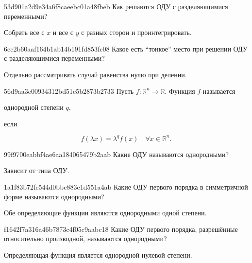 \begin{note}{53d901a2d9e34a6f8caeebc01a48fbeb}
    Как решаются ОДУ с разделяющимися переменными?

    \begin{cloze}{1}
        Собрать все с \({ x }\) и все с \({ y }\) с разных сторон и проинтегрировать.
    \end{cloze}
\end{note}

\begin{note}{6ec2b60aaf164b1ab14b191fd853fc08}
    Какое есть ``тонкое'' место при решении ОДУ с разделяющимися переменными?

    \begin{cloze}{1}
        Отдельно рассматривать случай равенства нулю при делении.
    \end{cloze}
\end{note}

\begin{note}{56d9aa3e00934312bd51c5b2873b2733}
    Пусть \({ f : \mathbb R^{n} \to \mathbb R }\).
    Функция \({ f }\) называется \begin{icloze}{2}однородной степени \({ q }\),\end{icloze} если
    \begin{icloze}{1}
        \[
            f(\lambda x) = \lambda^{q} f(x) \quad \forall x \in \mathbb R^{n}.
        \]
    \end{icloze}
\end{note}

\begin{note}{99f9700eabbf4ae6aa184065479b2aab}
    Какие ОДУ называются однородными?

    \begin{cloze}{1}
        Зависит от типа ОДУ.
    \end{cloze}
\end{note}

\begin{note}{1a1f83b72fc544d0bbc883e1d551a4ab}
    Какие ОДУ первого порядка в симметричной форме называются однородными?

    \begin{cloze}{1}
        Обе определяющие функции являются однородными одной степени.
    \end{cloze}
\end{note}

\begin{note}{f1642f7a316a46b7873c4f05c9aabc18}
    Какие ОДУ первого порядка, разрешённые относительно производной, называются однородными?

    \begin{cloze}{1}
        Определяющая функция является однородной нулевой степени.
    \end{cloze}
\end{note}


